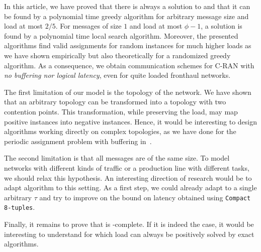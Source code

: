 \documentclass[pdflatex,sn-mathphys,iicol]{sn-jnl}%
\theoremstyle{thmstyleone}%
\theoremstyle{thmstyletwo}%
\theoremstyle{thmstylethree}%
\begin{document}
In this article, we have proved that there is always a solution to \pma and that it can be found by a polynomial time greedy algorithm for arbitrary message size and load at most $2/5$. For messages of size $1$ and load at most $\phi - 1$, a solution is found by a polynomial time local search algorithm. Moreover, the presented algorithms find valid assignments for random instances for much higher loads as we have shown empirically but also theoretically for a randomized greedy algorithm. As a consequence, we obtain communication schemes for C-RAN with \emph{no buffering nor logical latency}, even for quite loaded fronthaul networks.

The first limitation of our model is the topology of the network. We have shown that an arbitrary topology can be transformed into a topology with two contention points. This transformation, while preserving the load, may map positive instances into negative instances. Hence, it would be interesting to design algorithms working directly on complex topologies, as we have done for the periodic assignment problem with buffering in~\cite{guiraud2021deterministic}. 

The second limitation is that all messages are of the same size. 
To model networks with different kinds of traffic or a production line with different tasks, we should relax this hypothesis. An interesting direction of research would be to adapt algorithm \swapandmove to this setting. As a first step, we could already adapt \swapandmove to a single arbitrary $\tau$ and try to improve on the bound on latency obtained using \texttt{Compact 8-tuples}.

Finally, it remains to prove that \pma is \NP-complete. If it is indeed the case, it would be interesting to understand for which load \pma can always be positively solved by exact algorithms. 


\end{document}
